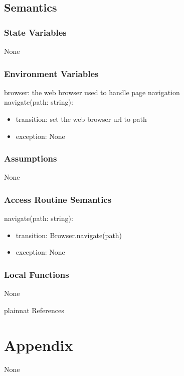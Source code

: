 \documentclass[12pt, titlepage]{article}
\begin{document}
\subsection{Semantics}

\subsubsection{State Variables}

None

\subsubsection{Environment Variables}

browser: the web browser used to handle page navigation\\
navigate(path: string):
\begin{itemize}
    \item transition: set the web browser url to path
    \item exception:    None
\end{itemize}

\subsubsection{Assumptions}

None

\subsubsection{Access Routine Semantics}

\noindent navigate(path: string):
\begin{itemize}
    \item transition: Browser.navigate(path)
    \item exception: None
\end{itemize}


\subsubsection{Local Functions}

None

\newpage

 {plainnat}
 {References}

\newpage

\section{Appendix} \label{Appendix}

None
\end{document}
